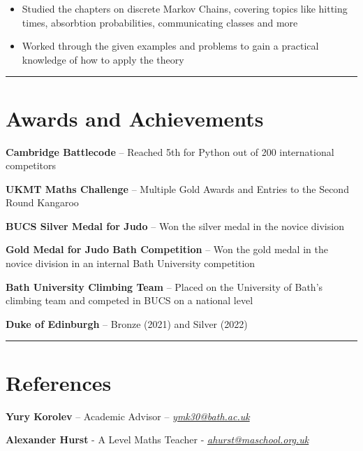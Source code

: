 \documentclass[11pt, a4paper]{article}
\newcommand{\cvline}{\vspace{-4pt}\noindent\rule{\linewidth}{0.5pt}\vspace{-8pt}}
\begin{document}
\begin{itemize}[leftmargin=*, itemsep=-3pt, topsep=2pt]
	\item Studied the chapters on discrete Markov Chains, covering topics like
		hitting times, absorbtion probabilities, communicating classes and more
	\item Worked through the given examples and problems to gain a practical
		knowledge of how to apply the theory
\end{itemize}

\cvline
\section{Awards and Achievements}
\vspace{2pt}
{\large

\textbf{Cambridge Battlecode} -- Reached 5th for Python out of 200 international competitors

\textbf{UKMT Maths Challenge} -- Multiple Gold Awards and Entries to the Second Round Kangaroo

\vspace{2pt}

\textbf{BUCS Silver Medal for Judo} -- Won the silver medal in the novice division 

\vspace{2pt}

\textbf{Gold Medal for Judo Bath Competition} -- Won the gold medal in the novice division in an internal Bath University competition

\vspace{2pt}

\textbf{Bath University Climbing Team} -- Placed on the University of Bath's climbing team and competed in BUCS on a national level

\vspace{2pt}

\textbf{Duke of Edinburgh} -- Bronze (2021) and Silver (2022)

\vspace{2pt}
}


\cvline
\section{References}
\vspace{2pt}
{
\large 
\textbf{Yury Korolev }– Academic Advisor – \href{mailto:ymk30@bath.ac.uk}{\textit{ymk30@bath.ac.uk}}

\textbf{Alexander Hurst }- A Level Maths Teacher - \href{mailto:ahurst@maschool.org.uk}{\textit{ahurst@maschool.org.uk}}
}
\end{document}
